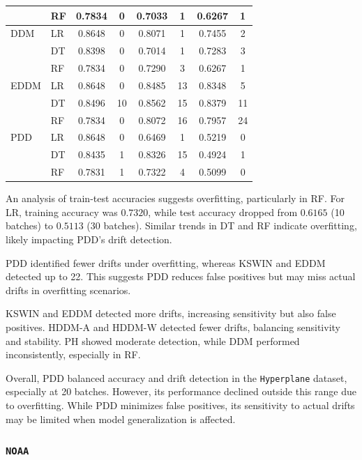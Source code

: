 \begin{table}[H]
\begin{tabular}{llcccccc}
        & RF & 0.7834 & 0 & 0.7033 & 1 & 0.6267 & 1 \\
        \midrule
        DDM & LR & 0.8648 & 0 & 0.8071 & 1 & 0.7455 & 2 \\
        & DT & 0.8398 & 0 & 0.7014 & 1 & 0.7283 & 3 \\
        & RF & 0.7834 & 0 & 0.7290 & 3 & 0.6267 & 1 \\
        \midrule
        EDDM & LR & 0.8648 & 0 & 0.8485 & 13 & 0.8348 & 5 \\
        & DT & 0.8496 & 10 & 0.8562 & 15 & 0.8379 & 11 \\
        & RF & 0.7834 & 0 & 0.8072 & 16 & 0.7957 & 24 \\
        \midrule
        PDD & LR & 0.8648 & 0 & 0.6469 & 1 & 0.5219 & 0 \\
        & DT & 0.8435 & 1 & 0.8326 & 15 & 0.4924 & 1 \\
        & RF & 0.7831 & 1 & 0.7322 & 4 & 0.5099 & 0 \\
        \midrule
    \end{tabular}
\end{table}

An analysis of train-test accuracies suggests overfitting, particularly in RF. For LR, training accuracy was \(0.7320\), while test accuracy dropped from \(0.6165\) (10 batches) to \(0.5113\) (30 batches). Similar trends in DT and RF indicate overfitting, likely impacting PDD's drift detection.

PDD identified fewer drifts under overfitting, whereas KSWIN and EDDM detected up to 22. This suggests PDD reduces false positives but may miss actual drifts in overfitting scenarios.

KSWIN and EDDM detected more drifts, increasing sensitivity but also false positives. HDDM-A and HDDM-W detected fewer drifts, balancing sensitivity and stability. PH showed moderate detection, while DDM performed inconsistently, especially in RF.

Overall, PDD balanced accuracy and drift detection in the \texttt{Hyperplane} dataset, especially at 20 batches. However, its performance declined outside this range due to overfitting. While PDD minimizes false positives, its sensitivity to actual drifts may be limited when model generalization is affected.

\hypertarget{section-2}{%
\subsubsection{\texorpdfstring{\texttt{NOAA}}{}}\label{section-2}}

